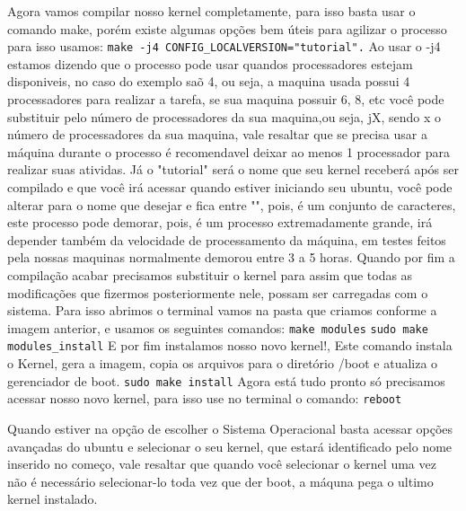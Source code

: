 \documentclass[12pt]{article}
\begin{document}
	Agora vamos compilar nosso kernel completamente, para isso basta usar o comando make, porém existe algumas opções bem úteis para agilizar o processo para isso usamos: \newline
	\verb!make -­j4 CONFIG_LOCALVERSION="tutorial".! \newline
	Ao usar o -j4 estamos dizendo que o processo pode usar quandos processadores estejam disponiveis, no caso do exemplo saõ 4, ou seja, a maquina usada possui 4 processadores para realizar a tarefa, se sua maquina possuir 6, 8, etc você pode substituir pelo número de processadores da sua maquina,ou seja, jX, sendo x o número de processadores da sua maquina, vale resaltar que se precisa usar a máquina durante o processo é recomendavel deixar ao menos 1 processador para realizar suas atividas. Já o "tutorial" será o nome que seu kernel receberá após ser compilado e que você irá acessar quando estiver iniciando seu ubuntu, você pode alterar para o nome que desejar e fica entre "", pois, é um conjunto de caracteres, este processo pode demorar, pois, é um processo extremadamente grande, irá depender também da velocidade de processamento da máquina, em testes feitos pela nossas maquinas normalmente demorou entre 3 a 5 horas.
	\newline
	Quando por fim a compilação acabar precisamos substituir o kernel para assim que todas as modificações que fizermos posteriormente nele, possam ser carregadas com o sistema. Para isso abrimos o terminal vamos na pasta que criamos conforme a imagem anterior, e usamos os seguintes comandos: \newline
	\verb"make modules" \newline
	\verb"sudo make modules_install"\newline
	E por fim instalamos nosso novo kernel!, Este comando instala o Kernel, gera a imagem, copia os arquivos para o diretório /boot e atualiza o gerenciador de boot.\newline
	\verb"sudo make install" \newline
	Agora está tudo pronto só precisamos acessar nosso novo kernel, para isso use no terminal o comando:\newline
	\verb"reboot" \newline
	
	Quando estiver na opção de escolher o Sistema Operacional basta acessar opções avançadas do ubuntu e selecionar o seu kernel, que estará identificado pelo nome inserido no começo, vale resaltar que quando você selecionar o kernel uma vez não é necessário selecionar-lo toda vez que der boot, a máquna pega o ultimo kernel instalado.
	
\end{document}

